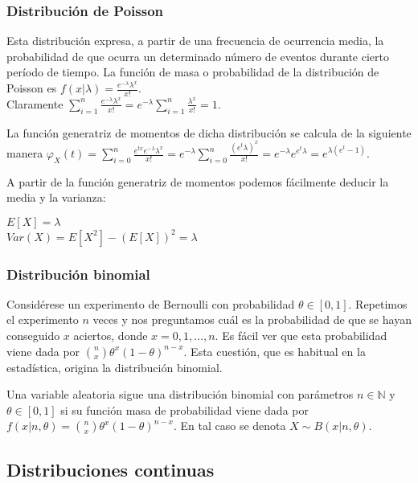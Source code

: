 \documentclass{article}
\begin{document}
\subsubsection{Distribución de Poisson}
Esta distribución expresa, a partir de una frecuencia de ocurrencia media, la probabilidad de que ocurra un determinado número de eventos durante cierto período de tiempo. La función de masa o probabilidad de la distribución de Poisson es $f(x| \lambda) = \frac{e^{-\lambda}{\lambda}^x}{x!}$. \\Claramente $\sum^n_{i=1}  \frac{e^{-\lambda}{\lambda}^x}{x!} = e^{-\lambda} \sum^n_{i=1}  \frac{{\lambda}^x}{x!}  = 1$.


La función generatriz de momentos de dicha distribución se calcula de la siguiente manera $\varphi_X(t) = \sum^n_{i=0} \frac{e^{tx}e^{-\lambda}{\lambda}^x}{x!} = e^{-\lambda} \sum^n_{i=0}   \frac{(e^{t}  \lambda)^x}{x!} =  e^{-\lambda}  e ^{e^{t} \lambda} = e ^{\lambda (e^t -1 )}$.

A partir de la función generatriz de momentos podemos fácilmente deducir la media y la varianza:
\begin{center}
	$E[X] = \lambda $
	\\$Var(X) =  E[X^2] - (E[X])^2 =  \lambda$
\end{center}

\subsubsection{Distribución binomial}

Considérese un experimento de Bernoulli con probabilidad $\theta \in [0,1]$. Repetimos el experimento $n$ veces y nos preguntamos cuál es la probabilidad de que se hayan conseguido $x$ aciertos, donde $x = 0, 1, \ldots, n$. Es fácil ver que esta probabilidad viene dada por $\binom{n}{x} \theta^x (1-\theta)^{n-x}$. Esta cuestión, que es habitual en la estadística, origina la distribución binomial.

\begin{definition}
    Una variable aleatoria sigue una distribución binomial con parámetros $n \in \mathbb{N}$ y $\theta \in [0,1]$  si su función masa de probabilidad viene dada por $f(x|n,\theta) = \binom{n}{x} \theta^x (1-\theta)^{n-x}$. En tal caso se denota $X \sim B(x|n,\theta)$.
\end{definition}

\subsection{Distribuciones continuas}
\end{document}
